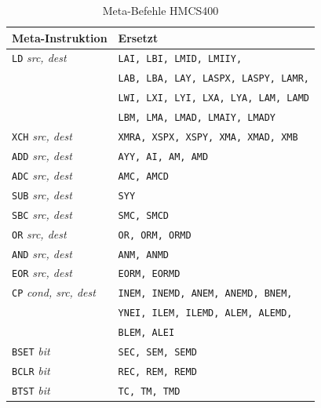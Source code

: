 \documentclass[12pt,a4paper,twoside]{report}
\newcommand{\tty}[1]{{\tt #1}}
\begin{document}
\begin{table}
\begin{center}\begin{tabular}{|l|l|}
\hline
Meta-Instruktion          & Ersetzt \\
\hline
\tty{LD} {\em src, dest}        & \tty{LAI, LBI, LMID, LMIIY,} \\
                                & \tty{LAB, LBA, LAY, LASPX, LASPY, LAMR,} \\
                                & \tty{LWI, LXI, LYI, LXA, LYA, LAM, LAMD} \\
                                & \tty{LBM, LMA, LMAD, LMAIY, LMADY} \\
\tty{XCH} {\em src, dest}       & \tty{XMRA, XSPX, XSPY, XMA, XMAD, XMB} \\
\tty{ADD} {\em src, dest}       & \tty{AYY, AI, AM, AMD} \\
\tty{ADC} {\em src, dest}       & \tty{AMC, AMCD} \\
\tty{SUB} {\em src, dest}       & \tty{SYY} \\
\tty{SBC} {\em src, dest}       & \tty{SMC, SMCD} \\
\tty{OR}  {\em src, dest}       & \tty{OR, ORM, ORMD} \\
\tty{AND} {\em src, dest}       & \tty{ANM, ANMD} \\
\tty{EOR} {\em src, dest}       & \tty{EORM, EORMD} \\
\tty{CP}  {\em cond, src, dest} & \tty{INEM, INEMD, ANEM, ANEMD, BNEM,} \\
                                & \tty{YNEI, ILEM, ILEMD, ALEM, ALEMD,} \\
                                & \tty{BLEM, ALEI} \\
\tty{BSET} {\em bit}            & \tty{SEC, SEM, SEMD} \\
\tty{BCLR} {\em bit}            & \tty{REC, REM, REMD} \\
\tty{BTST} {\em bit}            & \tty{TC, TM, TMD} \\
\hline
\end{tabular}\end{center}
\caption{Meta-Befehle HMCS400}
\label{TabHMCS400Meta}
\end{table}
\end{document}
